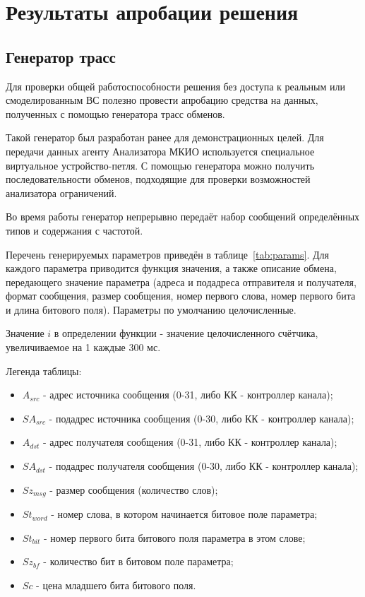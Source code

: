 \section{Результаты апробации решения}


\subsection{Генератор трасс}

Для проверки общей работоспособности решения без доступа к реальным 
или смоделированным ВС полезно провести апробацию средства на данных, 
полученных с помощью генератора трасс обменов.

Такой генератор был разработан ранее для демонстрационных целей. Для 
передачи данных агенту Анализатора МКИО используется специальное виртуальное 
устройство-петля. С помощью генератора можно получить последовательности 
обменов, подходящие для проверки возможностей анализатора ограничений.

Во время работы генератор непрерывно передаёт набор сообщений определённых 
типов и содержания с  частотой. 

Перечень генерируемых параметров приведён в таблице~\ref{tab:params}. Для 
каждого параметра приводится функция значения, а также описание 
обмена, передающего значение параметра (адреса и подадреса отправителя и 
получателя, формат сообщения, размер сообщения, номер первого слова, номер 
первого бита и длина битового поля). Параметры по умолчанию целочисленные.

Значение $i$ в определении функции - значение целочисленного счётчика, 
увеличиваемое на 1 каждые 300 мс.

Легенда таблицы:

\begin{itemize}
 \item $A_{src}$ - адрес источника сообщения (0-31, либо КК - контроллер 
канала);
 \item $SA_{src}$ - подадрес источника сообщения (0-30, либо КК - контроллер 
канала);
 \item $A_{dst}$ - адрес получателя сообщения (0-31, либо КК - контроллер 
канала);
 \item $SA_{dst}$ - подадрес получателя сообщения (0-30, либо КК - контроллер 
канала);
 \item $Sz_{msg}$ - размер сообщения (количество слов);
 \item $St_{word}$ - номер слова, в котором начинается битовое поле параметра;
 \item $St_{bit}$ - номер первого бита битового поля параметра в этом слове;
 \item $Sz_{bf}$ - количество бит в битовом поле параметра;
 \item $Sc$ - цена младшего бита битового поля.
\end{itemize}

